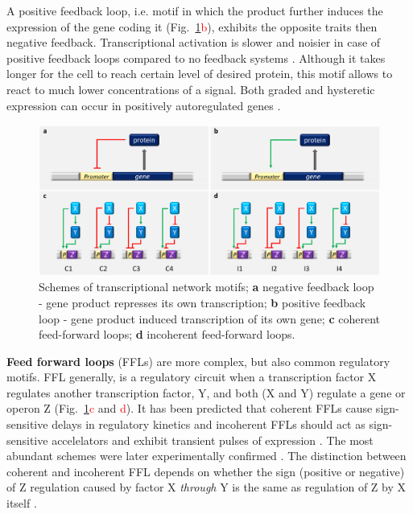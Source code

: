 A positive feedback loop, i.e. motif in which the product further induces the expression of the gene coding it (Fig.~\ref{motifs}\textcolor{red}{b}), exhibits the opposite traits then negative feedback.
Transcriptional activation is slower and noisier in case of positive feedback loops compared to no feedback systems \cite{maeda2006regulatory, sayut2007noise}.
Although it takes longer for the cell to reach certain level of desired protein, this motif allows to react to much lower concentrations of a signal.
Both graded and hysteretic expression can occur in positively autoregulated genes \cite{maeda2006regulatory}.

\begin{figure}[ht!]
  \centering
  \includegraphics[scale=0.29]{text/Pictures/TxnMotifs.png}
	\caption{Schemes of transcriptional network motifs; \textbf{a} negative feedback loop - gene product represses its own transcription; \textbf{b} positive feedback loop - gene product induced transcription of its own gene; \textbf{c} coherent feed-forward loops; \textbf{d} incoherent feed-forward loops.}
	\label{motifs}
\end{figure}

\textbf{Feed forward loops} (FFLs) are more complex, but also common regulatory motifs.
FFL generally, is a regulatory circuit when a transcription factor X regulates another transcription factor, Y, and both (X and Y) regulate a gene or operon Z (Fig.~\ref{motifs}\textcolor{red}{c} and \textcolor{red}{d}).
It has been predicted that coherent FFLs cause sign-sensitive delays in regulatory kinetics and incoherent FFLs should act as sign-sensitive accelelators and exhibit transient pulses of expression \cite{mangan2003structure}.
The most abundant schemes were later experimentally confirmed \cite{mangan2003coherent, kalir2005coherent, mangan2006incoherent}.
The distinction between coherent and incoherent FFL depends on whether the sign (positive or negative) of Z regulation caused by factor X \textit{through} Y is the same as regulation of Z by X itself \cite{shen2002network, mangan2003structure}.

